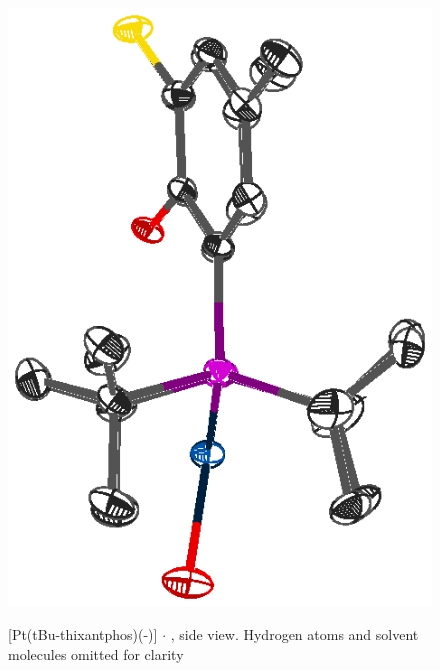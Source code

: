 \begin{figure}[ht]
\begin{center}
\vspace{0.5cm}
\includegraphics{../Figures/Crystalplatinumdioxygenside.eps}
\caption[X-ray crystal structure of \texorpdfstring{[Pt(tBu-thixantphos)(\hapto{}-){]}} P $\cdot{}$  side view]{[Pt(tBu-thixantphos)(\hapto{}-)] $\cdot{}$ , side view.  Hydrogen atoms and solvent molecules omitted for clarity}
\vspace{0.2cm}
\label{crystal:dioxygenside}
\end{center}
\end{figure}
\vspace{0.2cm}

